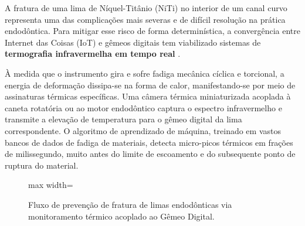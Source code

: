 A fratura de uma lima de Níquel-Titânio (NiTi) no interior de um canal curvo representa uma das complicações mais severas e de difícil resolução na prática endodôntica. Para mitigar esse risco de forma determinística, a convergência entre Internet das Coisas (IoT) e gêmeos digitais tem viabilizado sistemas de \textbf{termografia infravermelha em tempo real} \cite{katsoulakis2024digital}. 

À medida que o instrumento gira e sofre fadiga mecânica cíclica e torcional, a energia de deformação dissipa-se na forma de calor, manifestando-se por meio de assinaturas térmicas específicas. Uma câmera térmica miniaturizada acoplada à caneta rotatória ou ao motor endodôntico captura o espectro infravermelho e transmite a elevação de temperatura para o gêmeo digital da lima correspondente. O algoritmo de aprendizado de máquina, treinado em vastos bancos de dados de fadiga de materiais, detecta micro-picos térmicos em frações de milissegundo, muito antes do limite de escoamento e do subsequente ponto de ruptura do material.

\begin{figure}[h!]
    \centering
    \begin{adjustbox}{max width=\textwidth}
\end{adjustbox}
    \caption{Fluxo de prevenção de fratura de limas endodônticas via monitoramento térmico acoplado ao Gêmeo Digital.}
    \label{fig:niti-thermal}
\end{figure}

